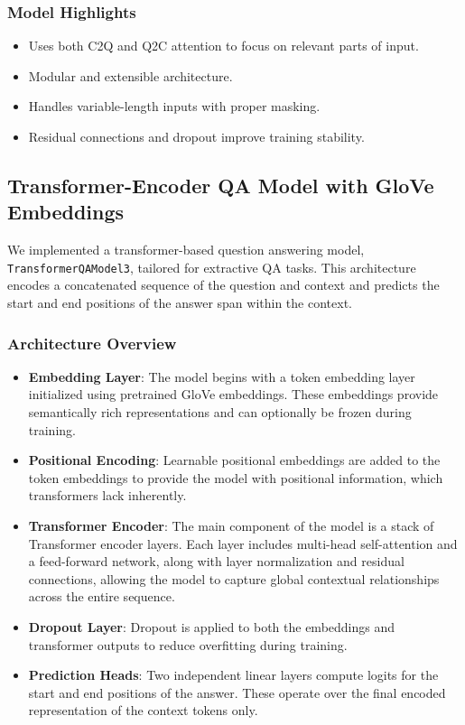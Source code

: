\documentclass[runningheads]{llncs}
\begin{document}
\subsubsection{Model Highlights}
\begin{itemize}
    \item Uses both C2Q and Q2C attention to focus on relevant parts of input.
    \item Modular and extensible architecture.
    \item Handles variable-length inputs with proper masking.
    \item Residual connections and dropout improve training stability.
\end{itemize}

\subsection{Transformer-Encoder QA Model with GloVe Embeddings}

We implemented a transformer-based question answering model, \texttt{TransformerQAModel3}, tailored for extractive QA tasks. This architecture encodes a concatenated sequence of the question and context and predicts the start and end positions of the answer span within the context.

\subsubsection{Architecture Overview}
\begin{itemize}
    \item \textbf{Embedding Layer}: The model begins with a token embedding layer initialized using pretrained GloVe embeddings. These embeddings provide semantically rich representations and can optionally be frozen during training.
    \item \textbf{Positional Encoding}: Learnable positional embeddings are added to the token embeddings to provide the model with positional information, which transformers lack inherently.
    \item \textbf{Transformer Encoder}: The main component of the model is a stack of Transformer encoder layers. Each layer includes multi-head self-attention and a feed-forward network, along with layer normalization and residual connections, allowing the model to capture global contextual relationships across the entire sequence.
    \item \textbf{Dropout Layer}: Dropout is applied to both the embeddings and transformer outputs to reduce overfitting during training.
    \item \textbf{Prediction Heads}: Two independent linear layers compute logits for the start and end positions of the answer. These operate over the final encoded representation of the context tokens only.
\end{itemize}
\end{document}
